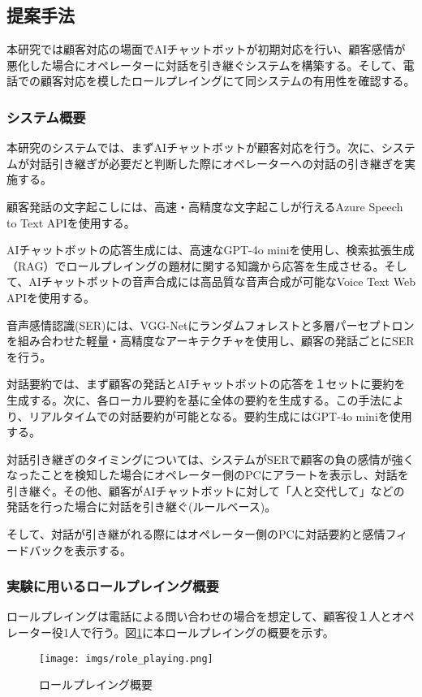 \documentclass[a4j,10pt, twocolumn]{jarticle}
\begin{document}
\subsection{提案手法}
本研究では顧客対応の場面でAIチャットボットが初期対応を行い、顧客感情が悪化した場合にオペレーターに対話を引き継ぐシステムを構築する。そして、電話での顧客対応を模したロールプレイングにて同システムの有用性を確認する。

\subsubsection{システム概要}
本研究のシステムでは、まずAIチャットボットが顧客対応を行う。次に、システムが対話引き継ぎが必要だと判断した際にオペレーターへの対話の引き継ぎを実施する。

顧客発話の文字起こしには、高速・高精度な文字起こしが行えるAzure Speech to Text APIを使用する。

AIチャットボットの応答生成には、高速なGPT-4o miniを使用し、検索拡張生成（RAG）でロールプレイングの題材に関する知識から応答を生成させる。そして、AIチャットボットの音声合成には高品質な音声合成が可能なVoice Text Web APIを使用する。

音声感情認識(SER)には、VGG-Netにランダムフォレストと多層パーセプトロンを組み合わせた軽量・高精度なアーキテクチャ\cite{SER method}を使用し、顧客の発話ごとにSERを行う。

対話要約では、まず顧客の発話とAIチャットボットの応答を１セットに要約を生成する。次に、各ローカル要約を基に全体の要約を生成する\cite{RTSS method}。この手法により、リアルタイムでの対話要約が可能となる。要約生成にはGPT-4o miniを使用する。

対話引き継ぎのタイミングについては、システムがSERで顧客の負の感情が強くなったことを検知した場合にオペレーター側のPCにアラートを表示し、対話を引き継ぐ。その他、顧客がAIチャットボットに対して「人と交代して」などの発話を行った場合に対話を引き継ぐ(ルールベース)。

そして、対話が引き継がれる際にはオペレーター側のPCに対話要約と感情フィードバックを表示する。

\subsubsection{実験に用いるロールプレイング概要}
ロールプレイングは電話による問い合わせの場合を想定して、顧客役１人とオペレーター役1人で行う。図\ref{role_playing}に本ロールプレイングの概要を示す。

\begin{figure}[H]
    \centering
    \texttt{[image: imgs/role\_playing.png]}
    \caption{ロールプレイング概要}
    \label{role_playing}
\end{figure}
\end{document}
